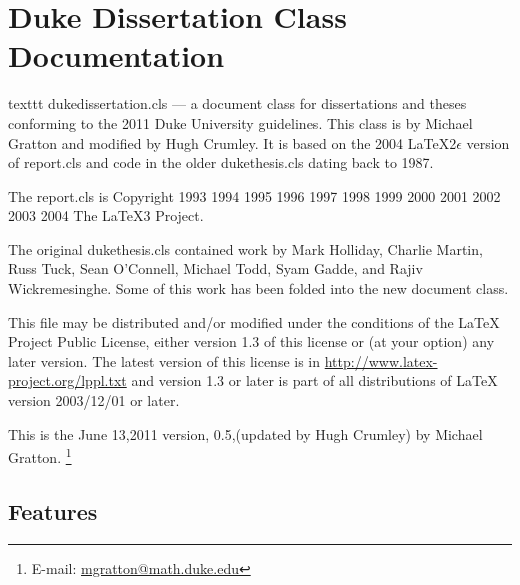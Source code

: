 \chapter{Duke Dissertation Class Documentation}
\label{chap:guide}


texttt{ dukedissertation.cls } --- a document class for dissertations and theses
conforming to the 2011 Duke University guidelines.  This class is by
Michael Gratton and modified by Hugh Crumley.  It is based on the 2004 \LaTeX2$\epsilon$ version of
report.cls and code in the older dukethesis.cls dating back to 1987.

The report.cls is Copyright 1993 1994 1995 1996 1997 1998 1999 2000 2001 2002
2003 2004 The LaTeX3 Project.

The original dukethesis.cls contained work by Mark Holliday, Charlie
Martin, Russ Tuck, Sean O'Connell, Michael Todd, Syam Gadde, and Rajiv
Wickremesinghe.  Some of this work has been folded into the new document class.

This file may be distributed and/or modified under the
conditions of the LaTeX Project Public License, either version 1.3
of this license or (at your option) any later version.
The latest version of this license is in
\url{http://www.latex-project.org/lppl.txt}
and version 1.3 or later is part of all distributions of LaTeX
version 2003/12/01 or later.

This is the June 13,2011 version, 0.5,(updated by Hugh Crumley) by Michael Gratton. \footnote{
E-mail: \href{mailto:mgratton@math.duke.edu}{mgratton@math.duke.edu}}

\section{Features}

